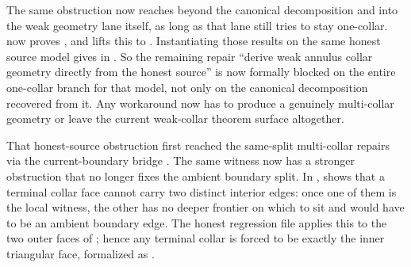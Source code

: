 \documentclass[11pt]{article}
\begin{document}
The same obstruction now reaches beyond the canonical decomposition and into
the weak geometry lane itself, as long as that lane still tries to stay
one-collar.   now proves
,
and  lifts this to
.
Instantiating those results on the same honest source model gives
in .  So the
remaining repair ``derive weak annulus collar geometry directly from the honest
source'' is now formally blocked on the entire one-collar branch for that
model, not only on the canonical decomposition recovered from it.  Any
workaround now has to produce a genuinely multi-collar geometry or leave the
current weak-collar theorem surface altogether.

That honest-source obstruction first reached the same-split multi-collar
repairs via the current-boundary bridge
.
The same witness now has a stronger obstruction that no longer fixes the
ambient boundary split.  In
,
shows that a terminal collar face cannot carry two distinct interior edges:
once one of them is the local witness, the other has no deeper frontier on
which to sit and would have to be an ambient boundary edge.  The honest
regression file applies this to the two outer faces of
; hence any terminal collar is forced
to be exactly the inner triangular face, formalized as
.
\end{document}
